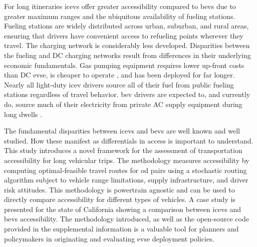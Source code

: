 For long itineraries \glspl{icev} offer greater accessibility compared to \glspl{bev} due to greater maximum ranges and the ubiquitous availability of fueling stations. Fueling stations are widely distributed across urban, suburban, and rural areas, ensuring that drivers have convenient access to refueling points wherever they travel. The charging network is considerably less developed. Disparities between the fueling and DC charging networks result from differences in their underlying economic fundamentals. Gas pumping equipment requires lower up-front costs than DC \gls{evse}, is cheaper to operate \cite{Gamage_2023}, and has been deployed for far longer. Nearly all light-duty \gls{icev} drivers source all of their fuel from public fueling stations regardless of travel behavior. \gls{bev} drivers are expected to, and currently do, source much of their electricity from private AC supply equipment during long dwells \cite{Hardman_2018}. 


The fundamental disparities between \glspl{icev} and \glspl{bev} are well known and well studied. How these manifest as differentials in access is important to understand. This study introduces a novel framework for the assessment of transportation accessibility for long vehicular trips. The methodology measures accessibility by computing optimal-feasible travel routes for \gls{od} pairs using a stochastic routing algorithm subject to vehicle range limitations, supply infrastructure, and driver risk attitudes. This methodology is powertrain agnostic and can be used to directly compare accessibility for different types of vehicles. A case study is presented for the state of California showing a comparison between \glspl{icev} and \glspl{bev} accessibility. The methodology introduced, as well as the open-source code provided in the supplemental information is a valuable tool for planners and policymakers in originating and evaluating \gls{evse} deployment policies.